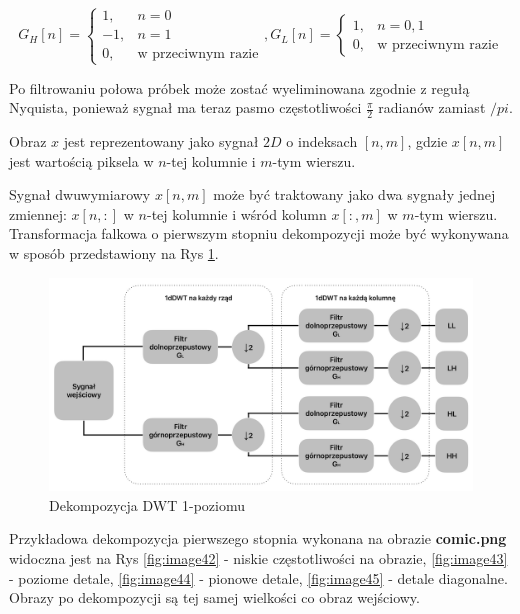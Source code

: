 \begin{equation}
    G_H[n]=\left\{\begin{array}{ll}
    1, & n=0 \\
    -1, & n=1 \\
    0, & \text {w przeciwnym razie}
    \end{array}, 
    G_L[n]= \begin{cases}1, & n=0,1 \\
    0, & \text {w przeciwnym razie}\end{cases}\right.
\end{equation}

Po filtrowaniu połowa próbek może zostać wyeliminowana zgodnie z regułą Nyquista, ponieważ sygnał ma teraz pasmo częstotliwości $\frac{\pi}{2}$ radianów zamiast $/pi$.

Obraz $x$ jest reprezentowany jako sygnał $2 D$ o indeksach $[n,m]$, gdzie $x[n,m]$ jest wartością piksela w $n$-tej kolumnie i $m$-tym wierszu.

Sygnał dwuwymiarowy $x[n,m]$ może być traktowany jako dwa sygnały jednej zmiennej: $x[n,:]$ w $n$-tej kolumnie i wśród kolumn $x[:,m]$ w $m$-tym wierszu. Transformacja falkowa o pierwszym stopniu dekompozycji może być wykonywana w sposób przedstawiony na Rys \ref{fig:image41}.

\begin{figure}[ht]
    \centering
    \begin{minipage}[t]{0.6\linewidth}
        \includegraphics[width=\linewidth]{Rozdziały/02.Podstawy_teoretyczne/Obrazy/DWT_dekompozycja.png}
        \caption{Dekompozycja DWT 1-poziomu}
        \label{fig:image41}
    \end{minipage}
\end{figure}

Przykładowa dekompozycja pierwszego stopnia wykonana na obrazie \textbf{comic.png} widoczna jest na Rys \ref{fig:image42} - niskie częstotliwości na obrazie, \ref{fig:image43} - poziome detale, \ref{fig:image44} - pionowe detale, \ref{fig:image45} - detale diagonalne. Obrazy po dekompozycji są tej samej wielkości co obraz wejściowy. 

